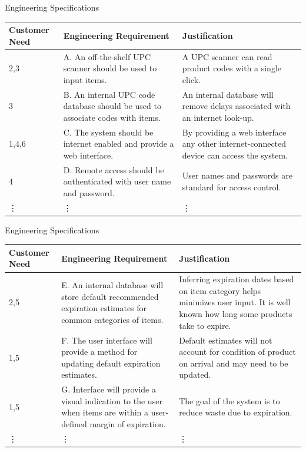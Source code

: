\documentclass{beamer}
\begin{document}
\begin{frame}{Engineering Specifications}
\footnotesize
\begin{tabular}{| p{0.6in} | p{2in} |p{1.5in} |}
\hline
Customer Need & Engineering Requirement & Justification \\
\hline
2,3 &A. An off-the-shelf UPC scanner should be used to input items. & A UPC scanner can read product codes with a single click.\\
\hline
3 &B. An internal UPC code database should be used to associate codes with items.&An internal database will remove delays associated with an internet look-up.\\
\hline
1,4,6&C. The system should be internet enabled and provide a web interface.&By providing a web interface any other internet-connected device can access the system.\\
\hline
4&D. Remote access should be authenticated with user name and password.&User names and passwords are standard for access control.\\
\hline
\vdots & \vdots & \vdots \\
\hline
\end{tabular}
\end{frame}

\begin{frame}{Engineering Specifications}
\footnotesize
\begin{tabular}{| p{0.6in} | p{2in} |p{1.5in} |}
\hline
Customer Need & Engineering Requirement & Justification \\
\hline
2,5&E. An internal database will store default recommended expiration estimates for common categories of items.&Inferring expiration dates based on item category helps minimizes user input. It is well known how long some products take to expire.\\
\hline
1,5&F. The user interface will provide a method for updating default expiration estimates.&Default estimates will not account for condition of product on arrival and may need to be updated.\\
\hline
1,5&G. Interface will provide a visual indication to the user when items are within a user-defined margin of expiration.&The goal of the system is to reduce waste due to expiration.\\
\hline
\vdots & \vdots & \vdots \\
\hline
\end{tabular}
\end{frame}
\end{document}
